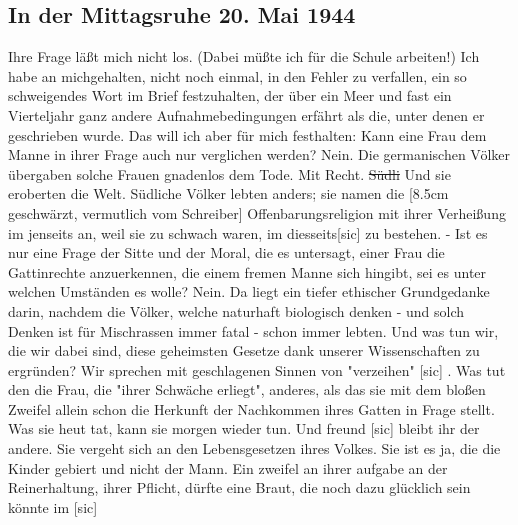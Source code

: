\subsection{In der Mittagsruhe 20. Mai 1944}

Ihre Frage l\"{a}{\ss}t mich nicht los.
(Dabei m\"{u}{\ss}te ich f\"{u}r die Schule arbeiten!)
Ich habe an michgehalten, nicht noch einmal, in den Fehler zu verfallen, ein so schweigendes Wort im Brief festzuhalten, der \"{u}ber ein Meer und fast ein Vierteljahr ganz andere Aufnahmebedingungen erf\"{a}hrt als die, unter denen er geschrieben wurde.
Das will ich aber f\"{u}r mich festhalten: Kann eine Frau dem Manne in ihrer Frage auch nur verglichen werden?
Nein.
Die germanischen V\"{o}lker \"{u}bergaben solche Frauen gnadenlos dem Tode.
Mit Recht.
\st{S\"{u}dli} Und sie eroberten die Welt.
S\"{u}dliche V\"{o}lker lebten anders; sie namen die {\color{red} [8.5cm geschw\"{a}rzt, vermutlich vom Schreiber] Offenbarungsreligion mit ihrer Verhei{\ss}ung im jenseits an, weil sie zu schwach waren, im diesseits[sic] } zu bestehen.
- Ist es nur eine Frage der Sitte und der Moral, die es untersagt, einer Frau die Gattinrechte anzuerkennen, die einem fremen Manne sich hingibt, sei es unter welchen Umst\"{a}nden es wolle?
Nein.
Da liegt ein tiefer ethischer Grundgedanke darin, nachdem die V\"{o}lker, welche naturhaft biologisch denken - und solch Denken ist f\"{u}r Mischrassen immer fatal - schon immer lebten.
Und was tun wir, die wir dabei sind, diese geheimsten Gesetze dank unserer Wissenschaften zu ergr\"{u}nden?
Wir sprechen mit geschlagenen Sinnen von "verzeihen"{\color{red} [sic] }.
Was tut den die Frau, die "ihrer Schw\"{a}che erliegt", anderes, als das sie mit dem blo{\ss}en Zweifel allein schon die Herkunft der Nachkommen ihres Gatten in Frage stellt.
Was sie heut tat, kann sie morgen wieder tun.
Und freund{\color{red} [sic] } bleibt ihr der andere.
Sie vergeht sich an den Lebensgesetzen ihres Volkes.
Sie ist es ja, die die Kinder gebiert und nicht der Mann.
Ein zweifel an ihrer aufgabe an der Reinerhaltung, ihrer Pflicht, d\"{u}rfte eine Braut, die noch dazu gl\"{u}cklich sein k\"{o}nnte im{\color{red} [sic] }

\clearpage
